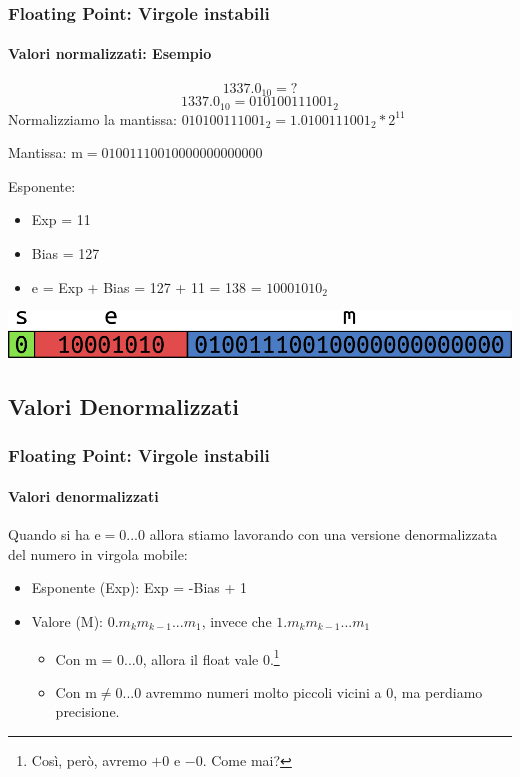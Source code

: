 \documentclass{beamer}
\begin{document}
	  \begin{frame}
	    \frametitle{Floating Point: Virgole instabili}
	    \framesubtitle{Valori normalizzati: Esempio}
	    		$$1337.0_{10} = ?$$
	    		\vspace{1em}
	    		\pause
	    		$$1337.0_{10} = 010100111001_{2}$$
	    		Normalizziamo la mantissa: $010100111001_{2} = 1.0100111001_{2}*2^{11}$
	    	  
	    	  Mantissa: $\text{m} = 01001110010000000000000$
	    	  
	    	  Esponente:
	    	  \begin{itemize}
	    	  		\item Exp = 11
	    	  		\item Bias = 127
	    	  		\item e = Exp + Bias = 127 + 11 = 138 = $10001010_{2}$
	    	  \end{itemize}
	    	  
	    	  \vspace{1em}
	    	  \pause
	    	  \begin{center}
					\includegraphics[width=.8\textwidth]{IMGs/SingleExample.png}
				\end{center}
	  \end{frame}
  \subsection{Valori Denormalizzati}
	  \begin{frame}
	    \frametitle{Floating Point: Virgole instabili}
	    \framesubtitle{Valori denormalizzati}
	    Quando si ha $\text{e} = 0\text{...}0$ allora stiamo lavorando con una versione
	    denormalizzata del numero in virgola mobile:
	    
	    \begin{itemize}
	      \item Esponente (Exp): Exp = -Bias + 1
	      \item Valore (M): $0.m_{k}m_{k-1}...m_{1}$, invece che $1.m_{k}m_{k-1}...m_{1}$      
	        \begin{itemize}
	      			\item Con m = 0...0, allora il float vale 0.\footnote{Così, però, avremo $+0$ e $-0$. Come mai?}
	      			\item Con $\text{m} \neq 0\text{...}0$ avremmo numeri molto piccoli vicini a 0, ma perdiamo precisione.
	      		\end{itemize}
	    \end{itemize}
	  \end{frame}
\end{document}
